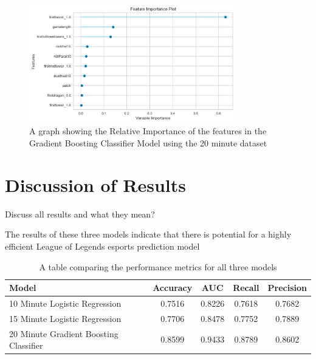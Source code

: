 \begin{figure}[h]
    \centering
    \includegraphics[width=0.8\textwidth]{figures/FeatureImport20}
    \caption{A graph showing the Relative Importance of the features in the Gradient Boosting Classifier Model using the 20 minute dataset}
    \label{fig:FeatureImport20}
\end{figure}


\section{Discussion of Results}\label{sec:discussion-of-results}

Discuss all results and what they mean?

The results of these three models indicate that there is potential for a highly efficient League of Legends esports prediction model



\begin{table}[h]
    \centering
    \begin{tabular}{lcccc}
        \toprule
        \textbf{Model} & \textbf{Accuracy} & \textbf{AUC} & \textbf{Recall} & \textbf{Precision} \\
        \midrule
        10 Minute Logistic Regression & 0.7516 & 0.8226 & 0.7618 & 0.7682 \\
        15 Minute Logistic Regression & 0.7706 & 0.8478 & 0.7752 & 0.7889 \\
        20 Minute Gradient Boosting Classifier & 0.8599 & 0.9433 & 0.8789 & 0.8602 \\
        \bottomrule
    \end{tabular}
    \caption{A table comparing the performance metrics for all three models}
    \label{tab:ModelCompare}
\end{table}